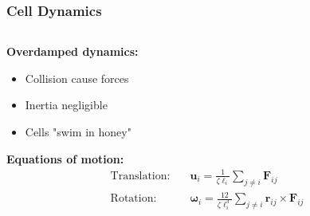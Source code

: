 \documentclass[10pt,t]{beamer}
\begin{document}
\begin{frame}
    \frametitle{Cell Dynamics}

    \begin{columns}[c]
        \begin{column}{0.5\textwidth}

            \textbf{Overdamped dynamics:}
            \begin{itemize}
                \item Collision cause forces
                \item Inertia negligible
                \item Cells "swim in honey"
            \end{itemize}

            \vspace{0.5cm}

            \textbf{Equations of motion:}
            \begin{equation*}
                \begin{align}
                    \text{Translation:} \quad & \mathbf{u}_i = \frac{1}{\zeta \ell_i} \sum_{j \neq i} \mathbf{F}_{ij}                                    \\
                    \text{Rotation:} \qquad   & \boldsymbol{\omega}_i = \frac{12}{\zeta \ell_i^3} \sum_{j \neq i} \mathbf{r}_{ij} \times \mathbf{F}_{ij}
                \end{align}
            \end{equation*}
        \end{column}


\end{columns}
\end{frame}
\end{document}
